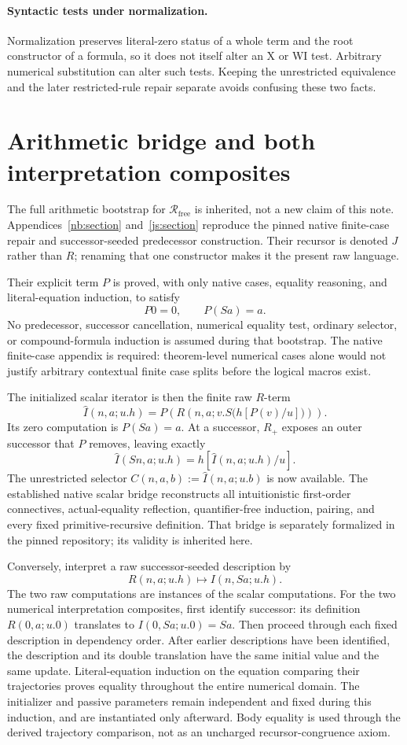 \documentclass[11pt]{article}
\theoremstyle{definition}\newtheorem{definition}[theorem]{Definition}
\newcommand{\Rfree}{\mathcal R_{\mathrm{free}}}
\begin{document}
\paragraph{Syntactic tests under normalization.}
Normalization preserves literal-zero status of a whole term and the root constructor of a formula, so it does not itself alter an X or WI test. Arbitrary numerical substitution can alter such tests. Keeping the unrestricted equivalence and the later restricted-rule repair separate avoids confusing these two facts.

\section{Arithmetic bridge and both interpretation composites}

The full arithmetic bootstrap for \(\Rfree\) is inherited, not a new claim of this note. Appendices~\ref{nb:section} and~\ref{js:section} reproduce the pinned native finite-case repair and successor-seeded predecessor construction. Their recursor is denoted \(J\) rather than \(R\); renaming that one constructor makes it the present raw language.

Their explicit term \(P\) is proved, with only native cases, equality reasoning, and literal-equation induction, to satisfy
\[
P0=0,\qquad P(Sa)=a.
\]
No predecessor, successor cancellation, numerical equality test, ordinary selector, or compound-formula induction is assumed during that bootstrap. The native finite-case appendix is required: theorem-level numerical cases alone would not justify arbitrary contextual finite case splits before the logical macros exist.

The initialized scalar iterator is then the finite raw \(R\)-term
\[
\widehat I(n,a;u.h)
=
P\!\left(R(n,a;v.S\bigl(h[P(v)/u]\bigr))\right).
\]
Its zero computation is \(P(Sa)=a\). At a successor, \(R_+\) exposes an outer successor that \(P\) removes, leaving exactly
\[
\widehat I(Sn,a;u.h)=h[\widehat I(n,a;u.h)/u].
\]
The unrestricted selector \(C(n,a,b):=\widehat I(n,a;u.b)\) is now available. The established native scalar bridge reconstructs all intuitionistic first-order connectives, actual-equality reflection, quantifier-free induction, pairing, and every fixed primitive-recursive definition. That bridge is separately formalized in the pinned repository; its validity is inherited here.

Conversely, interpret a raw successor-seeded description by
\[
R(n,a;u.h)\longmapsto I(n,Sa;u.h).
\]
The two raw computations are instances of the scalar computations. For the two numerical interpretation composites, first identify successor: its definition \(R(0,a;u.0)\) translates to \(I(0,Sa;u.0)=Sa\). Then proceed through each fixed description in dependency order. After earlier descriptions have been identified, the description and its double translation have the same initial value and the same update. Literal-equation induction on the equation comparing their trajectories proves equality throughout the entire numerical domain. The initializer and passive parameters remain independent and fixed during this induction, and are instantiated only afterward. Body equality is used through the derived trajectory comparison, not as an uncharged recursor-congruence axiom.
\end{document}
